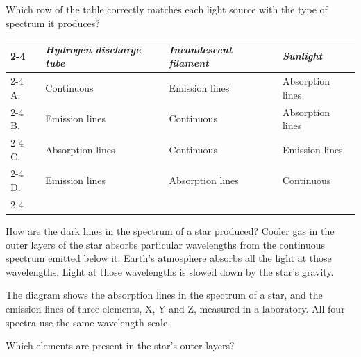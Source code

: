 \begin{quizq}{}
Which row of the table correctly matches each light source with the type of spectrum it produces?
\begin{center}
  \renewcommand\arraystretch{1.7}
  \begin{tabular}{@{}p{10mm}|>{\centering\arraybackslash}p{35mm}|>{\centering\arraybackslash}p{35mm}|>{\centering\arraybackslash}p{40mm}|}
    \cline{2-4}
    & \textit{Hydrogen discharge tube} & \textit{Incandescent filament} & \textit{Sunlight}\\ \cline{2-4}
    A. & Continuous & Emission lines & Absorption lines\\ \cline{2-4}
    B. & Emission lines & Continuous & Absorption lines\\ \cline{2-4}
    C. & Absorption lines & Continuous & Emission lines\\ \cline{2-4}
    D. & Emission lines & Absorption lines & Continuous\\ \cline{2-4}
  \end{tabular}
\end{center}
\end{quizq}

\begin{quizq}{}
How are the dark lines in the spectrum of a star produced?
  {Cooler gas in the outer layers of the star absorbs particular wavelengths from the continuous
   spectrum emitted below it.}
  {Earth's atmosphere absorbs all the light at those wavelengths.}
  {Light at those wavelengths is slowed down by the star's gravity.}
\end{quizq}

\begin{quizq}{}
The diagram shows the absorption lines in the spectrum of a star, and the emission lines of three
elements, X, Y and Z, measured in a laboratory. All four spectra use the same wavelength scale.
\begin{center}
\end{center}
Which elements are present in the star's outer layers?
\end{quizq}

